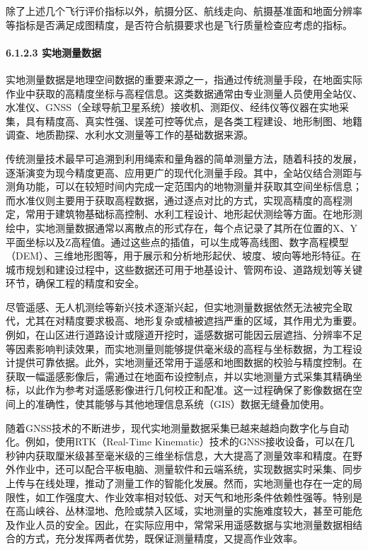 除了上述几个飞行评价指标以外，航摄分区、航线走向、航摄基准面和地面分辨率等指标是否满足成图精度，是否符合航摄要求也是飞行质量检查应考虑的指标。

\paragraph{6.1.2.3 实地测量数据}\label{ux5b9eux5730ux6d4bux91cfux6570ux636e}

实地测量数据是地理空间数据的重要来源之一，指通过传统测量手段，在地面实际作业中获取的高精度坐标与高程信息。这类数据通常由专业测量人员使用全站仪、水准仪、GNSS（全球导航卫星系统）接收机、测距仪、经纬仪等仪器在实地采集，具有精度高、真实性强、误差可控等优点，是各类工程建设、地形制图、地籍调查、地质勘探、水利水文测量等工作的基础数据来源。

传统测量技术最早可追溯到利用绳索和量角器的简单测量方法，随着科技的发展，逐渐演变为现今精度更高、应用更广的现代化测量手段。其中，全站仪结合测距与测角功能，可以在较短时间内完成一定范围内的地物测量并获取其空间坐标信息；而水准仪则主要用于获取高程数据，通过逐点对比的方式，实现高精度的高程测定，常用于建筑物基础标高控制、水利工程设计、地形起伏测绘等方面。在地形测绘中，实地测量数据通常以离散点的形式存在，每个点记录了其所在位置的X、Y平面坐标以及Z高程值。通过这些点的插值，可以生成等高线图、数字高程模型（DEM）、三维地形图等，用于展示和分析地形起伏、坡度、坡向等地形特征。在城市规划和建设过程中，这些数据还可用于地基设计、管网布设、道路规划等关键环节，确保工程的精度和安全。

尽管遥感、无人机测绘等新兴技术逐渐兴起，但实地测量数据依然无法被完全取代，尤其在对精度要求极高、地形复杂或植被遮挡严重的区域，其作用尤为重要。例如，在山区进行道路设计或隧道开挖时，遥感数据可能因云层遮挡、分辨率不足等因素影响判读效果，而实地测量则能够提供毫米级的高程与坐标数据，为工程设计提供可靠依据。此外，实地测量还常用于遥感和地图数据的校验与精度控制。在获取一幅遥感影像后，需通过在地面布设控制点，并以实地测量方式采集其精确坐标，以此作为参考对遥感影像进行几何校正和配准。这一过程确保了影像数据在空间上的准确性，使其能够与其他地理信息系统（GIS）数据无缝叠加使用。

随着GNSS技术的不断进步，现代实地测量数据采集已越来越趋向数字化与自动化。例如，使用RTK（Real-Time Kinematic）技术的GNSS接收设备，可以在几秒钟内获取厘米级甚至毫米级的三维坐标信息，大大提高了测量效率和精度。在野外作业中，还可以配合平板电脑、测量软件和云端系统，实现数据实时采集、同步上传与在线处理，推动了测量工作的智能化发展。然而，实地测量也存在一定的局限性，如工作强度大、作业效率相对较低、对天气和地形条件依赖性强等。特别是在高山峡谷、丛林湿地、危险或禁入区域，实地测量的实施难度较大，甚至可能危及作业人员的安全。因此，在实际应用中，常常采用遥感数据与实地测量数据相结合的方式，充分发挥两者优势，既保证测量精度，又提高作业效率。

